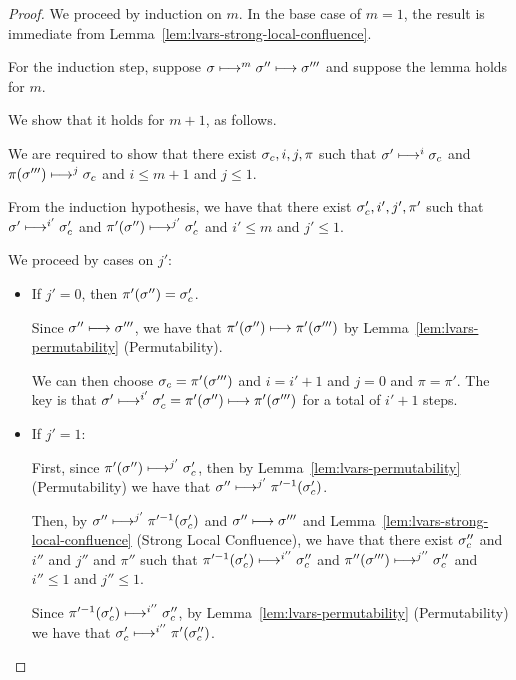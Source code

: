 \begin{proof}
  We proceed by induction on $m$.  In the base case of $m = 1$, the
  result is immediate from
  Lemma~\ref{lem:lvars-strong-local-confluence}.

  For the induction step, suppose $\sigma \longmapsto^m \sigma''
  \longmapsto \sigma'''$ and suppose the lemma holds for $m$.

  We show that it holds for $m + 1$, as follows.

  We are required to show that there exist $\sigma_c, i, j, \pi$ such
  that $\sigma' \longmapsto^{i} \sigma_c$ and $\pi(\sigma''')
  \longmapsto^{j} \sigma_c$ and $i \leq m + 1$ and $j \leq 1$.

  From the induction hypothesis, we have that there exist $\sigma_c',
  i', j', \pi'$ such that $\sigma' \longmapsto^{i'} \sigma_c'$ and
  $\pi'(\sigma'') \longmapsto^{j'} \sigma_c'$ and $i' \leq m$ and $j'
  \leq 1$.

  We proceed by cases on $j'$:
  \begin{itemize}

  \item If $j' = 0$, then $\pi'(\sigma'') = \sigma_c'$.

    Since $\sigma'' \longmapsto \sigma'''$, we have that $\pi'(\sigma'')
    \longmapsto \pi'(\sigma''')$ by
    Lemma~\ref{lem:lvars-permutability} (Permutability).

    We can then choose $\sigma_c = \pi'(\sigma''')$ and $i = i' + 1$ and
    $j = 0$ and $\pi = \pi'$.  The key is that $\sigma'
    \longmapsto^{i'} \sigma'_c = \pi'(\sigma'') \longmapsto
    \pi'(\sigma''')$ for a total of $i' + 1$ steps.
    
  \item If $j' = 1$:

    First, since $\pi'(\sigma'') \longmapsto^{j'} \sigma'_c$, then by
    Lemma~\ref{lem:lvars-permutability} (Permutability) we have that
    $\sigma'' \longmapsto^{j'} \pi'^{-1}(\sigma'_c)$.

    Then, by $\sigma'' \longmapsto^{j'} \pi'^{-1}(\sigma'_c)$ and
    $\sigma'' \longmapsto \sigma'''$ and
    Lemma~\ref{lem:lvars-strong-local-confluence} (Strong Local
    Confluence), we have that there exist $\sigma_c''$ and $i''$ and
    $j''$ and $\pi''$ such that $\pi'^{-1}(\sigma'_c)
    \longmapsto^{i''} \sigma_c''$ and $\pi''(\sigma''')
    \longmapsto^{j''} \sigma_c''$ and $i'' \leq 1$ and $j'' \leq 1$.

    Since $\pi'^{-1}(\sigma'_c) \longmapsto^{i''} \sigma_c''$, by
    Lemma~\ref{lem:lvars-permutability} (Permutability) we have that
    $\sigma'_c \longmapsto^{i''} \pi'(\sigma_c'')$.


\end{itemize}
\end{proof}
